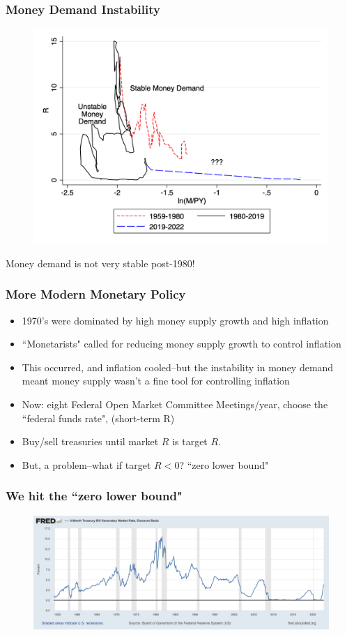 \documentclass{beamer}
\begin{document}
\begin{frame}
\frametitle[alignment=center]{Money Demand Instability}
\begin{figure}
\centering
\includegraphics[scale=0.24]{Figures/Fig_12pt14.png}
\end{figure}
Money demand is not very stable post-1980!
\end{frame}


\begin{frame}
\frametitle[alignment=center]{More Modern Monetary Policy}
\begin{itemize}
\item 1970's were dominated by high money supply growth and high inflation
\bigskip
\item ``Monetarists" called for reducing money supply growth to control inflation
\bigskip
\item This occurred, and inflation cooled--but the instability in money demand meant money supply wasn't a fine tool for controlling inflation
\bigskip
\item Now:  eight Federal Open Market Committee Meetings/year, choose the ``federal funds rate", (short-term R)
\bigskip
\item Buy/sell treasuries until market $R$ is target $R$.
\bigskip
\item But, a problem--what if target $R<0$?  ``zero lower bound"
\end{itemize}
\end{frame}

\begin{frame}
\frametitle[alignment=center]{We hit the ``zero lower bound"}
\begin{figure}
\centering
\includegraphics[scale=0.27]{Figures/Fredgraph.png}
\end{figure}
\end{frame}
\end{document}

